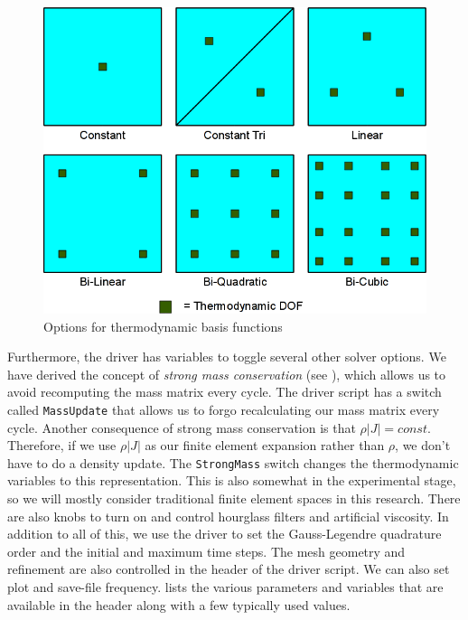 \begin{figure}[p!]
 \centering
 \includegraphics[width=5in,keepaspectratio=true]{./Figures/PresBasisFunctions.png}
 \caption{Options for thermodynamic basis functions}
 \label{fig:PresBasisFunctions}
\end{figure}

Furthermore, the driver has variables to toggle several other solver options. We have derived the concept of \emph{strong mass conservation} (see ), which allows us to avoid recomputing the mass matrix every cycle. The driver script has a switch called \texttt{MassUpdate} that allows us to forgo recalculating our mass matrix every cycle. Another consequence of strong mass conservation is that $\rho |J|=const$. Therefore, if we use $\rho |J|$ as our finite element expansion rather than $\rho$, we don't have to do a density update. The \texttt{StrongMass} switch changes the thermodynamic variables to this representation. This is also somewhat in the experimental stage, so we will mostly consider traditional finite element spaces in this research. There are also knobs to turn on and control hourglass filters and artificial viscosity. In addition to all of this, we use the driver to set the Gauss-Legendre quadrature order and the initial and maximum time steps. The mesh geometry and refinement are also controlled in the header of the driver script. We can also set plot and save-file frequency.  lists the various parameters and variables that are available in the header along with a few typically used values.

